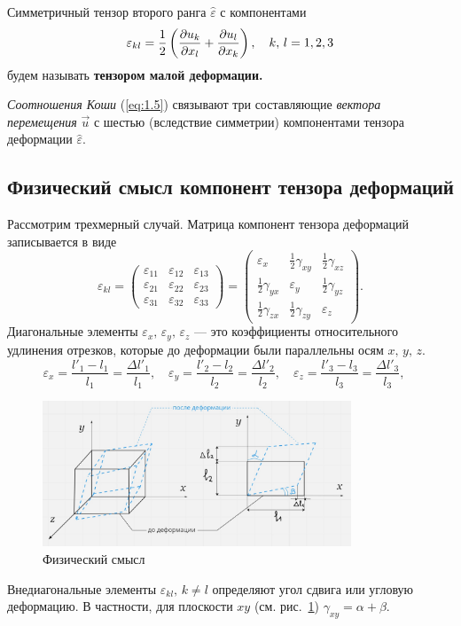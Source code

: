 \documentclass[12pt, a4paper]{article}
\begin{document}
Симметричный тензор второго ранга $\hat\varepsilon$ с компонентами 
\begin{equation}
	\varepsilon_{kl}=\frac12\left(\frac{\partial u_k}{\partial x_l}+\frac{\partial u_l}{\partial x_k}\right), \quad k,\,l=1,2,3
	\label{eq:1.5}
\end{equation}
будем называть \textbf{тензором малой деформации.}

\textit{Соотношения Коши} (\ref{eq:1.5}) связывают три составляющие \textit{вектора перемещения} $\vec u$ с шестью (вследствие симметрии) компонентами тензора деформации $\hat\varepsilon$.

	
	
	 \subsection{Физический смысл компонент тензора деформаций}
	 Рассмотрим трехмерный случай. Матрица компонент тензора деформаций записывается в виде
	 \begin{equation}
	\varepsilon_{kl} = 
\begin{pmatrix}
	\varepsilon_{11}&\varepsilon_{12}&\varepsilon_{13}\\
	\varepsilon_{21}&\varepsilon_{22}&\varepsilon_{23}\\
	\varepsilon_{31}&\varepsilon_{32}&\varepsilon_{33}
\end{pmatrix}
=
\begin{pmatrix}
	\varepsilon_x&\frac12\gamma_{xy}&\frac12\gamma_{xz}\\
	\frac12\gamma_{yx}&\varepsilon_y&\frac12\gamma_{yz}\\
	\frac12\gamma_{zx}&\frac12\gamma_{zy}&\varepsilon_z
\end{pmatrix}.
	 \end{equation}
  Диагональные элементы $\varepsilon_x,\,\varepsilon_y,\,\varepsilon_z$ --- это коэффициенты относительного удлинения отрезков, которые до деформации были параллельны осям $x,\,y,\,z.$
  \[
  \varepsilon_x = \frac{l'_1-l_1}{l_1} = \frac{\Delta l'_1}{l_1},\quad \varepsilon_y = \frac{l'_2-l_2}{l_2} = \frac{\Delta l'_2}{l_2},\quad \varepsilon_z = \frac{l'_3-l_3}{l_3} = \frac{\Delta l'_3}{l_3},\quad
  \]
\begin{figure}[H]
	\centering
\includegraphics[width=0.82\textwidth]{p3}
\caption{Физический смысл}
\label{fig:p3}
\end{figure}
  Внедиагональные элементы $\varepsilon_{kl},\,k \ne l$ определяют угол сдвига или угловую деформацию. В частности, для плоскости $xy$ (см. рис.~\ref{fig:p3}) $\gamma_{xy} = \alpha+\beta$.
  
\end{document}
